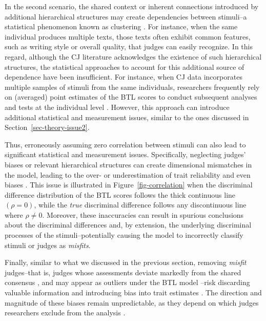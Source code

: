 \documentclass[
  authoryear,
  review,
  1p]{elsarticle}
\begin{document}
In the second scenario, the shared context or inherent connections
introduced by additional hierarchical structures may create dependencies
between stimuli--a statistical phenomenon known as clustering
\citep{Everitt_et_al_2010}. For instance, when the same individual
produces multiple texts, those texts often exhibit common features, such
as writing style or overall quality, that judges can easily recognize.
In this regard, although the CJ literature acknowledges the existence of
such hierarchical structures, the statistical approaches to account for
this additional source of dependence have been insufficient. For
instance, when CJ data incorporates multiple samples of stimuli from the
same individuals, researchers frequently rely on (averaged) point
estimates of the BTL scores to conduct subsequent analyses and tests at
the individual level
\citep{Bramley_et_al_2019, Boonen_et_al_2020, Bouwer_et_al_2023, vanDaal_et_al_2017, Jones_et_al_2019, Gijsen_et_al_2021}.
However, this approach can introduce additional statistical and
measurement issues, similar to the ones discussed in
Section~\ref{sec-theory-issue2}.

Thus, erroneously assuming zero correlation between stimuli can also
lead to significant statistical and measurement issues. Specifically,
neglecting judges' biases or relevant hierarchical structures can create
dimensional mismatches in the model, leading to the over- or
underestimation of trait reliability
\citep{Ackerman_1989, Hoyle_et_al_2023} and even biases
\citep{Wu_et_al_2022}. This issue is illustrated in
Figure~\ref{fig-correlation} when the discriminal difference
distribution of the BTL scores follows the thick continuous line
\((\rho = 0)\), while the \emph{true} discriminal difference follows any
discontinuous line where \(\rho \neq 0\). Moreover, these inaccuracies
can result in spurious conclusions about the discriminal differences
\citep{McElreath_2020} and, by extension, the underlying discriminal
processes of the stimuli--potentially causing the model to incorrectly
classify stimuli or judges as \emph{misfits}.

Finally, similar to what we discussed in the previous section, removing
\emph{misfit} judges--that is, judges whose assessments deviate markedly
from the shared consensus
\citep{Pollitt_2012a, Pollitt_2012b, vanDaal_et_al_2016, Goossens_et_al_2018, Wu_et_al_2022},
and may appear as outliers under the BTL model
\citep{Wu_et_al_2022}--risk discarding valuable information and
introducing bias into trait estimates \citep{Miller_2023}. The direction
and magnitude of these biases remain unpredictable, as they depend on
which judges researchers exclude from the analysis
\citep{Zimmerman_1994, OHagan_2018, McElreath_2020}.
\end{document}
